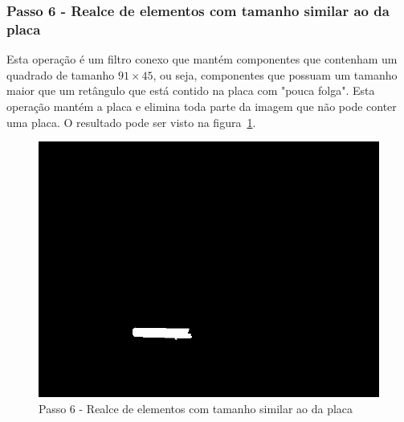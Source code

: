 \documentclass[11pt]{article} %
\begin{document}
\subsubsection{Passo 6 - Realce de elementos com tamanho similar ao da placa}
	Esta operação é um filtro conexo que mantém componentes que contenham um quadrado de tamanho $91\times45$, ou seja, componentes que possuam um tamanho maior que um retângulo que está contido na placa com "pouca folga". Esta operação mantém a placa e elimina toda parte da imagem que não pode conter uma placa. O resultado pode ser visto na figura~\ref{step5}.
	\begin{figure}[!h]
		\begin{center}
		\includegraphics[scale=0.5]{img_relatorio/step5.png}
		\caption{Passo 6 - Realce de elementos com tamanho similar ao da placa}\label{step5}
		\end{center}
	\end{figure}
\newpage
\end{document}
